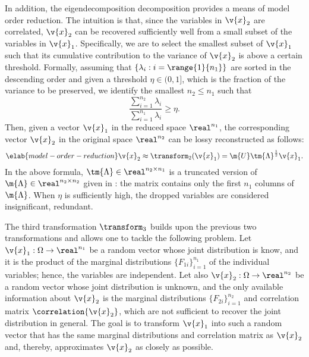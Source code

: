 In addition, the eigendecomposition decomposition provides a means of model
order reduction. The intuition is that, since the variables in $\v{x}_2$ are
correlated, $\v{x}_2$ can be recovered sufficiently well from a small subset of
the variables in $\v{x}_1$. Specifically, we are to select the smallest subset
of $\v{x}_1$ such that its cumulative contribution to the variance of $\v{x}_2$
is above a certain threshold. Formally, assuming that $\{ \lambda_i: i =
\range{1}{n_1} \}$ are sorted in the descending order and given a threshold
$\eta \in (0, 1]$, which is the fraction of the variance to be preserved, we
identify the smallest $n_2 \leq n_1$ such that
\[
  \frac{\sum_{i = 1}^{n_2} \lambda_i}{\sum_{i = 1}^{n_1} \lambda_i} \geq \eta.
\]
Then, given a vector $\v{x}_1$ in the reduced space $\real^{n_1}$, the
corresponding vector $\v{x}_2$ in the original space $\real^{n_2}$ can be lossy
reconstructed as follows:
\begin{equation} \elab{model-order-reduction}
  \v{x}_2 \approx \transform_2(\v{x}_1) = \m{U} \tm{\Lambda}^\frac{1}{2} \v{x}_1.
\end{equation}
In the above formula, $\tm{\Lambda} \in \real^{n_2 \times n_1}$ is a truncated
version of $\m{\Lambda} \in \real^{n_2 \times n_2}$ given in
: the matrix contains only the first $n_1$ columns of
$\m{\Lambda}$. When $\eta$ is sufficiently high, the dropped variables are
considered insignificant, redundant.

The third transformation $\transform_3$ builds upon the previous two
transformations and allows one to tackle the following problem. Let $\v{x}_1:
\Omega \to \real^{n_1}$ be a random vector whose joint distribution is know, and
it is the product of the marginal distributions $\{ F_{1i} \}_{i = 1}^{n_1}$ of
the individual variables; hence, the variables are independent. Let also
$\v{x}_2: \Omega \to \real^{n_2}$ be a random vector whose joint distribution is
unknown, and the only available information about $\v{x}_2$ is the marginal
distributions $\{ F_{2i} \}_{i = 1}^{n_2}$ and correlation matrix
$\correlation{\v{x}_2}$, which are not sufficient to recover the joint
distribution in general. The goal is to transform $\v{x}_1$ into such a random
vector that has the same marginal distributions and correlation matrix as
$\v{x}_2$ and, thereby, approximates $\v{x}_2$ as closely as possible.

